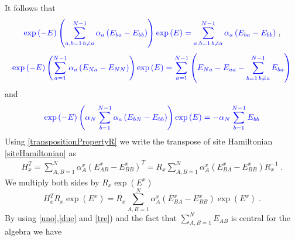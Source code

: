 \documentclass[10pt]{article}
\numberwithin{equation}{section}
\numberwithin{equation}{subsection}
\newcommand{\co}{\;,}
\newcommand{\dt}{\;.}
\newcommand{\fra}[1]{\textcolor[rgb]{0,0,1}{#1}}
\begin{document}
\fra{It follows that}
\begin{align}\label{uno}
	\fra{\exp{(-E)}\left(\sum_{a,b=1\,b\neq a}^{N-1}\alpha_{a}\left(E_{ba}-E_{bb}\right)\right)\exp{(E)}=\sum_{a,b=1\,b\neq a}^{N-1}\alpha_{a}\left(E_{ba}-E_{bb}\right)}\co
\end{align}
\begin{align}\label{due}
	\fra{\exp{(-E)}\left(\sum_{a=1}^{N-1}\alpha_{a}\left(E_{Na}-E_{NN}\right)\right)\exp{(E)}=\sum_{a=1}^{N-1}\left(E_{Na}-E_{aa}-\sum_{b=1\,b\neq a}^{N-1}E_{ba}\right)}
\end{align}
\fra{and}
\begin{align}\label{tre}
	\fra{\exp{(-E)}\left(\alpha_{N}\sum_{b=1}^{N-1}\alpha_{a}\left(E_{bN}-E_{bb}\right)\right)\exp{(E)}=-\alpha_{N}\sum_{b=1}^{N-1}E_{bb}}
\end{align}
Using \eqref{transpositionPropertyR} we write the transpose of site Hamiltonian \eqref{siteHamiltonian} as
\begin{equation}
    \begin{split}
H_{x}^{T}=\sum_{A,B=1}^{N}\alpha_{A}^{x}\left(E_{AB}^{x}-E_{BB}^{x}\right)^{T}=R_{x}\sum_{A,B=1}^{N}\alpha_{A}^{x}\left(E_{BA}^{x}-E_{BB}^{x}\right)R_{x}^{-1}\dt
    \end{split}
\end{equation}
We multiply both sides by $R_{x}\exp{(E^{x})}$
\begin{equation}\label{intermediateTransposeSite}
    H_{x}^{T}R_{x}\exp{(E^{x})}=R_{x}\sum_{A,B =1}^{N}\alpha_{A}^{x}\left(E_{B A}^{x}-E_{BB}^{x}\right)\exp{(E^{x})}\dt
\end{equation}
By using \fra{\eqref{uno},\eqref{due} and \eqref{tre})} and the fact that 
\fra{$\sum_{A,B=1}^{N}E_{AB}$} is central for the algebra we have 
\end{document}
